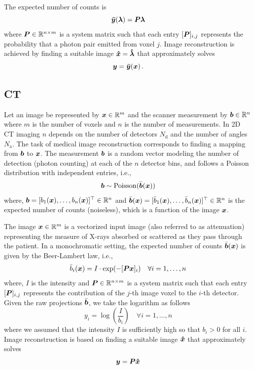 The expected number of counts is
\begin{equation}\label{eq:PET}
\bm{\bar{y}}(\bm{\lambda}) = \bm{P} \bm{\lambda}
\end{equation}
where $\bm{P} \in \mathbb{R}^{n\times m}$ is a system matrix such that each entry $[\bm{P}]_{i,j}$ represents the probability that a photon pair emitted from voxel $j$. Image reconstruction is achieved by finding a suitable image $\bm{\hat{x}} = \bm{\hat{\lambda}}$ that approximately solves 
\begin{equation}\label{eq:pb1solve}
\bm{y} = \bm{\bar{y}}(\bm{x}) \, .
\end{equation} 

\subsection{CT}
Let an image be represented by $\bm{x} \in \mathbb{R}^m$ and the scanner measurement by $\bm{b} \in \mathbb{R}^n$ where $m$ is the number of voxels and $n$ is the number of measurements. In \ac{2D} \ac{CT} imaging $n$ depends on the number of detectors $N_\mathrm{d}$ and the number of angles $N_\mathrm{a}$. The task of medical image reconstruction corresponds to finding a mapping from $\bm{b}$ to $\bm{x}$. The measurement $\bm{b}$ is a random vector modeling the number of detection (photon counting) at each of the $n$ detector bins, and follows a Poisson distribution with independent entries, i.e.,
\begin{equation}\label{eq:pCT}
\bm{b} \sim \mathrm{Poisson}(\bar{\bm{b}}(\bm{x}))
\end{equation}    
where, $\bm{b}  =  [b_1(\bm{x}),\dots,b_n(\bm{x})]^\top\in \mathbb{R}^n$ and $\bar{\bm{b}}(\bm{x})  =  [\bar{b}_1(\bm{x}),\dots,\bar{b}_n(\bm{x})]^\top\in \mathbb{R}^n$ is the expected number of counts (noiseless), which is a function of the image $\bm{x}$. 

The image $\bm{x}\in\mathbb{R}^m$ is a vectorized input image (also referred to as attenuation) representing the measure of X-rays absorbed or scattered as they pass through the patient. In a monochromatic setting, the expected number of counts $\bar{\bm{b}}(\bm{x})$  is given by the Beer-Lambert law, i.e.,
\begin{equation}\label{eq:CT}
\bar{b}_i(\bm{x}) = I \cdot \exp (-[\bm{P} \bm{x}]_i) \quad \forall i=1,\dots,n 
\end{equation}
where, $I$ is the intensity and $\bm{P} \in \mathbb{R}^{n\times m}$ is a system matrix such that each entry $[\bm{P}]_{i,j}$ represents the contribution of the $j$-th image voxel to the $i$-th detector. Given the raw projections $\bar{\bm{b}}$, we take the logarithm as follows
\begin{equation}
y_i = \log\left(\frac{I}{b_i}\right) \quad \forall i=1,\dots,n   
\end{equation}
where we assumed that the intensity $I$ is sufficiently high so that $b_i>0$ for all $i$. Image reconstruction is based on finding a suitable image $\bm{\hat{x}}$ that approximately solves 
\begin{equation}\label{eq:pb2solve}
\bm{y} = \bm{P} \bm{\hat{x}} 
\end{equation} 
 
